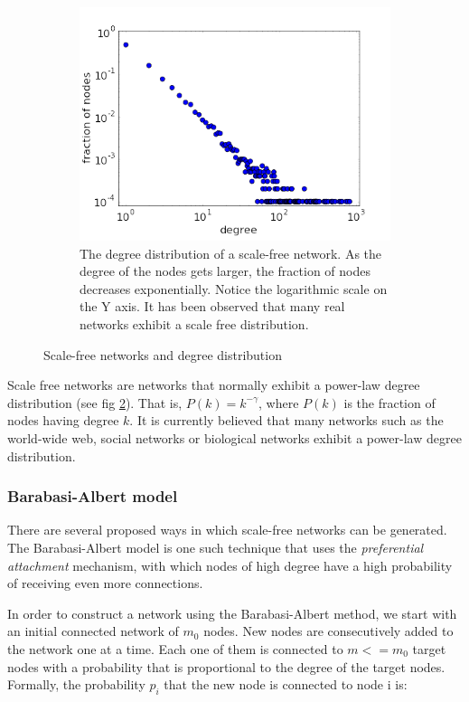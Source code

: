 \begin{figure}
\begin{subfigure}[b]{0.5\textwidth}
    \includegraphics[width=\textwidth]{images/deg_dist_scale_free.png}
    \caption{The degree distribution of a scale-free network. As the degree of
the nodes gets larger, the fraction of nodes decreases exponentially. Notice
the logarithmic scale on the Y axis. It has been observed that many real
networks exhibit a scale free distribution.}
    \label{fig:degree_distribution}    
   \end{subfigure}
   \caption{Scale-free networks and degree distribution}
   \label{fig:scale_free} 
\end{figure}


Scale free networks are networks that normally exhibit a power-law degree
distribution (see fig \ref{fig:scale_free}). That is, $ P(k) = k^{-\gamma} $,
where $P(k)$ is the fraction of
nodes having degree $k$. It is currently believed that many networks such as the
world-wide web, social networks or biological networks exhibit a power-law
degree distribution.

\subsubsection{Barabasi-Albert model}

There are several proposed ways in which scale-free networks can be
generated. The Barabasi-Albert model is one such technique that uses the
\emph{preferential attachment} mechanism, with which nodes of high degree have
a high probability of receiving even more connections. 

In order to construct a network using the Barabasi-Albert method, we start with
an initial connected network of $ m_0  $ nodes. New nodes are consecutively
added to the network one at a time. Each one of them is connected to $ m <= m_0 
$ target nodes with a probability that is proportional to the degree of the
target nodes. Formally, the probability $ p_i $ that the new node is connected
to node i is:

